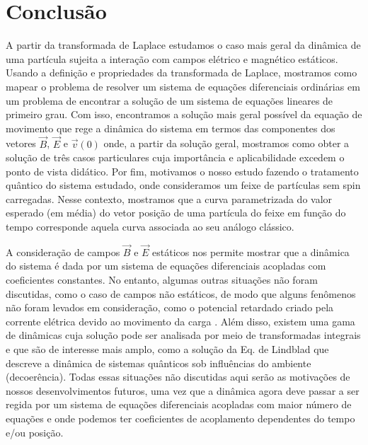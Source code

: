 \documentclass[twocolumn]{rbef}
\newcommand{\1}{\mathbbm{1}}
\begin{document}

\section{Conclusão}

A partir da transformada de Laplace estudamos o caso mais geral da
dinâmica de uma partícula sujeita a interação com campos elétrico e
magnético estáticos. Usando a definição e propriedades da transformada
de Laplace, mostramos como mapear o problema de resolver um sistema de
equações diferenciais ordinárias em um problema de encontrar a solução
de um sistema de equações lineares de primeiro grau. Com isso,
encontramos a solução mais geral possível da equação de movimento que
rege a dinâmica do sistema em termos das componentes dos vetores
$\vec{B}$, $\vec{E}$ e $\vec{v}(0)$ onde, a partir da solução geral,
mostramos como obter a solução de três casos particulares cuja
importância e aplicabilidade excedem o ponto de vista didático. Por fim,
motivamos o nosso estudo fazendo o tratamento quântico do sistema
estudado, onde consideramos um feixe de partículas sem spin
carregadas. Nesse contexto, mostramos que a curva parametrizada do valor
esperado (em média) do vetor posição de uma partícula do feixe em função
do tempo corresponde aquela curva associada ao seu análogo clássico.

A consideração de campos $\vec{B}$ e $\vec{E}$ estáticos nos permite
mostrar que a dinâmica do sistema é dada por um sistema de equações
diferenciais acopladas com coeficientes constantes. No entanto, algumas
outras situações não foram discutidas, como o caso de campos não
estáticos, de modo que alguns fenômenos não foram levados em
consideração, como o potencial retardado criado pela corrente elétrica
devido ao movimento da carga \cite{Jackson}. Além disso, existem uma
gama de dinâmicas cuja solução pode ser analisada por meio de
transformadas integrais e que são de interesse mais amplo, como a
solução da Eq. de Lindblad \cite{Nielsen:Book} que descreve a dinâmica
de sistemas quânticos sob influências do ambiente (decoerência). Todas
essas situações não discutidas aqui serão as motivações de nossos
desenvolvimentos futuros, uma vez que a dinâmica agora deve passar a ser
regida por um sistema de equações diferenciais acopladas com maior
número de equações e onde podemos ter coeficientes de acoplamento
dependentes do tempo e/ou posição.
\end{document}
